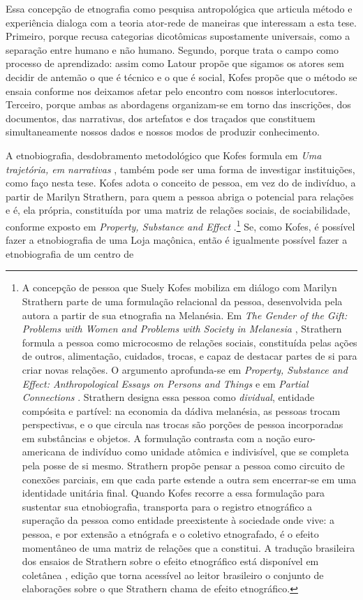 Essa concepção de etnografia como pesquisa antropológica que articula método e experiência dialoga com a teoria ator-rede de maneiras que interessam a esta tese. Primeiro, porque recusa categorias dicotômicas supostamente universais, como a separação entre humano e não humano. Segundo, porque trata o campo como processo de aprendizado: assim como Latour propõe que sigamos os atores sem decidir de antemão o que é técnico e o que é social, Kofes propõe que o método se ensaia conforme nos deixamos afetar pelo encontro com nossos interlocutores. Terceiro, porque ambas as abordagens organizam-se em torno das inscrições, dos documentos, das narrativas, dos artefatos e dos traçados que constituem simultaneamente nossos dados e nossos modos de produzir conhecimento.

A etnobiografia, desdobramento metodológico que Kofes formula em \textit{Uma trajetória, em narrativas} \parencite{kofes2001trajetoria}, também pode ser uma forma de investigar instituições, como faço nesta tese. Kofes adota o conceito de pessoa, em vez do de indivíduo, a partir de Marilyn Strathern, para quem a pessoa abriga o potencial para relações e é, ela própria, constituída por uma matriz de relações sociais, de sociabilidade, conforme exposto em \textit{Property, Substance and Effect} \parencite{strathern2000pse}.\footnote{A concepção de pessoa que Suely Kofes mobiliza em diálogo com Marilyn Strathern parte de uma formulação relacional da pessoa, desenvolvida pela autora a partir de sua etnografia na Melanésia. Em \textit{The Gender of the Gift: Problems with Women and Problems with Society in Melanesia} \parencite{strathern1988gender}, Strathern formula a pessoa como microcosmo de relações sociais, constituída pelas ações de outros, alimentação, cuidados, trocas, e capaz de destacar partes de si para criar novas relações. O argumento aprofunda-se em \textit{Property, Substance and Effect: Anthropological Essays on Persons and Things} \parencite{strathern2000pse} e em \textit{Partial Connections} \parencite{strathern2004partial}. Strathern designa essa pessoa como \textit{dividual}, entidade compósita e partível: na economia da dádiva melanésia, as pessoas trocam perspectivas, e o que circula nas trocas são porções de pessoa incorporadas em substâncias e objetos. A formulação contrasta com a noção euro-americana de indivíduo como unidade atômica e indivisível, que se completa pela posse de si mesmo. Strathern propõe pensar a pessoa como circuito de conexões parciais, em que cada parte estende a outra sem encerrar-se em uma identidade unitária final. Quando Kofes recorre a essa formulação para sustentar sua etnobiografia, transporta para o registro etnográfico a superação da pessoa como entidade preexistente à sociedade onde vive: a pessoa, e por extensão a etnógrafa e o coletivo etnografado, é o efeito momentâneo de uma matriz de relações que a constitui. A tradução brasileira dos ensaios de Strathern sobre o efeito etnográfico está disponível em coletânea \parencite{strathern2014efeito}, edição que torna acessível ao leitor brasileiro o conjunto de elaborações sobre o que Strathern chama de efeito etnográfico.} Se, como Kofes, é possível fazer a etnobiografia de uma Loja maçônica, então é igualmente possível fazer a etnobiografia de um centro de 